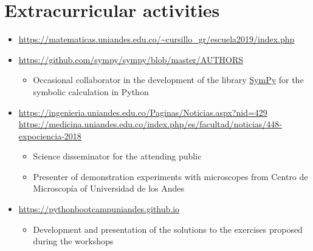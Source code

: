 \documentclass[11pt, letterpaper, sans]{moderncv}        %
\begin{document}
\section{Extracurricular activities}
	\begin{itemize}
		\item{
			{
				\url{https://matematicas.uniandes.edu.co/~cursillo_gr/escuela2019/index.php}
			}
		}
	
		\item{
			{
				\url{https://github.com/sympy/sympy/blob/master/AUTHORS}
				\vspace{3pt}
				\begin{itemize}
					\item Occasional collaborator in the development of the library \href{https://www.sympy.org/en/index.html}{\color{blue}SymPy} for the symbolic calculation in {\color{blue}Python}
				\end{itemize}
			}
		}
		
		\item{
			{
				\url{https://ingenieria.uniandes.edu.co/Paginas/Noticias.aspx?nid=429}\\
				\url{https://medicina.uniandes.edu.co/index.php/es/facultad/noticias/448-expociencia-2018}
				\vspace{3pt}
				\begin{itemize}
					\item Science disseminator for the attending public
					\item Presenter of demonstration experiments with microscopes from Centro de Microscop\'ia of Universidad de los Andes
				\end{itemize}
			}
		}
	
		\item{
			{
				\url{https://pythonbootcampuniandes.github.io}
				\vspace{3pt}
				\begin{itemize}
					\item Development and presentation of the solutions to the exercises proposed during the workshops
				\end{itemize}
			}
		}
	\end{itemize}
\end{document}
